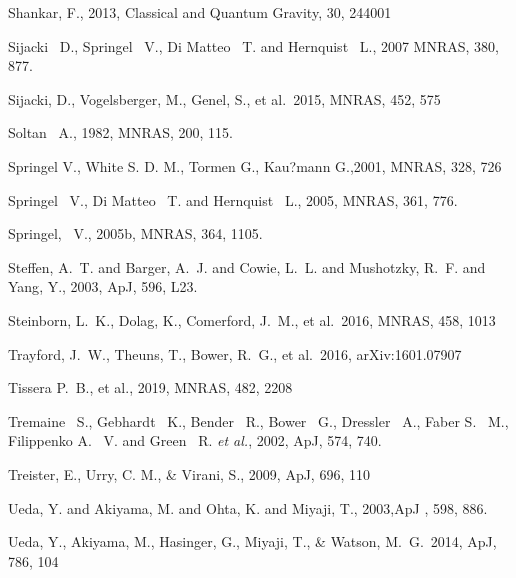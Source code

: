 \documentclass[a4paper,fleqn,usenatbib,letter]{mnras}
\begin{document}
\begin{thebibliography}{99}
Shankar, F., 2013, Classical and Quantum Gravity, 30, 244001

Sijacki ~D., Springel ~V., Di Matteo ~T. and Hernquist ~L., 2007
MNRAS,  380, 877.

Sijacki, D., Vogelsberger, M., Genel, S., et al.\ 2015, MNRAS, 452, 575 


Soltan ~A., 1982, MNRAS, 200, 115.

Springel V., White S. D. M., Tormen G., Kau?mann G.,2001, MNRAS, 328, 726



Springel ~V., Di Matteo ~T. and Hernquist ~L., 2005,
MNRAS, 361, 776.

Springel, ~V., 2005b, MNRAS, 364, 1105.

{Steffen}, A.~T. and {Barger}, A.~J. and {Cowie}, L.~L. and 
	{Mushotzky}, R.~F. and {Yang}, Y., 2003, ApJ, 596, L23.

Steinborn, L.~K., Dolag, K., Comerford, J.~M., et al.\ 2016, MNRAS, 458, 1013 


Trayford, J.~W., Theuns, T., Bower, R.~G., et al.\ 2016, arXiv:1601.07907 

Tissera P.~B., et al., 2019, MNRAS, 482, 2208

Tremaine ~S., Gebhardt ~K., Bender ~R., Bower ~G., Dressler ~A., Faber S. ~M., Filippenko A. ~V. and Green ~R. {\it et al.},
2002, ApJ, 574, 740.


Treister, E., Urry, C. M., \& Virani, S., 2009, ApJ, 696, 110

{Ueda}, Y. and {Akiyama}, M. and {Ohta}, K. and {Miyaji}, T.,
2003,ApJ , 598, 886.

 Ueda, Y., Akiyama, M., Hasinger, G., Miyaji, T., \& Watson, M.~G.\ 2014, ApJ, 786, 104 


\end{thebibliography}
\end{document}
